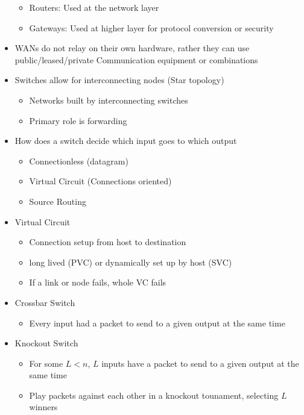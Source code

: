 \documentclass{article}
\begin{document}
\begin{itemize}
\begin{itemize}
            \item Routers: Used at the network layer
            \item Gateways: Used at higher layer for protocol conversion or security
        \end{itemize}
        \item WANs do not relay on their own hardware, rather they can use public/leased/private Communication equipment or combinations
        \item Switches allow for interconnecting nodes (Star topology)
        \begin{itemize}
            \item Networks built by interconnecting switches
            \item Primary role is forwarding
        \end{itemize}
        \item How does a switch decide which input goes to which output
        \begin{itemize}
            \item Connectionless (datagram)
            \item Virtual Circuit (Connections oriented)
            \item Source Routing
        \end{itemize}
        \item Virtual Circuit
        \begin{itemize}
            \item Connection setup from host to destination
            \item long lived (PVC) or dynamically set up by host (SVC)
            \item If a link or node fails, whole VC fails
        \end{itemize}
        \item Crossbar Switch
        \begin{itemize}
            \item Every input had a packet to send to a given output at the same time
        \end{itemize}
        \item Knockout Switch
        \begin{itemize}
            \item For some $L<n$, $L$ inputs have a packet to send to a given output at the same time
            \item Play packets against each other in a knockout tounament, selecting $L$ winners
        \end{itemize}
    \end{itemize}
\end{document}
